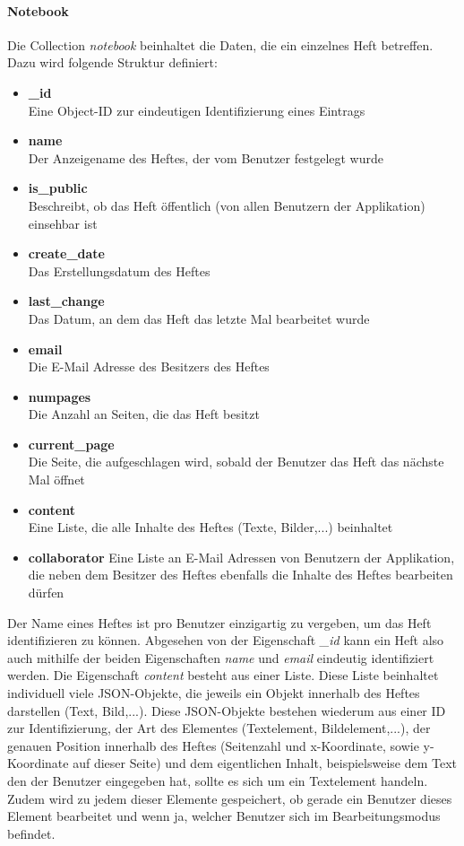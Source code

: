 \paragraph{Notebook}
\label{sec:datamgmt-notebook}
Die Collection \textit{notebook} beinhaltet die Daten, die ein einzelnes Heft betreffen. Dazu wird folgende Struktur definiert:
\begin{itemize}
\item \textbf{\_id}\\ Eine Object-ID zur eindeutigen Identifizierung eines Eintrags
\item \textbf{name}\\ Der Anzeigename des Heftes, der vom Benutzer festgelegt wurde
\item \textbf{is\_public}\\ Beschreibt, ob das Heft öffentlich (von allen Benutzern der Applikation) einsehbar ist
\item \textbf{create\_date}\\ Das Erstellungsdatum des Heftes
\item \textbf{last\_change}\\ Das Datum, an dem das Heft das letzte Mal bearbeitet wurde
\item \textbf{email}\\ Die E-Mail Adresse des Besitzers des Heftes
\item \textbf{numpages}\\ Die Anzahl an Seiten, die das Heft besitzt
\item \textbf{current\_page}\\ Die Seite, die aufgeschlagen wird, sobald der Benutzer das Heft das nächste Mal öffnet
\item \textbf{content}\\ Eine Liste, die alle Inhalte des Heftes (Texte, Bilder,...) beinhaltet
\item \textbf{collaborator} Eine Liste an E-Mail Adressen von Benutzern der Applikation, die neben dem Besitzer des Heftes ebenfalls die Inhalte des Heftes bearbeiten dürfen
\end{itemize}
Der Name eines Heftes ist pro Benutzer einzigartig zu vergeben, um das Heft identifizieren zu können. Abgesehen von der Eigenschaft \textit{\_id} kann ein Heft also auch mithilfe der beiden Eigenschaften \textit{name} und \textit{email} eindeutig identifiziert werden. Die Eigenschaft \textit{content} besteht aus einer Liste. Diese Liste beinhaltet individuell viele JSON-Objekte, die jeweils ein Objekt innerhalb des Heftes darstellen (Text, Bild,...). Diese JSON-Objekte bestehen wiederum aus einer ID zur Identifizierung, der Art des Elementes (Textelement, Bildelement,...), der genauen Position innerhalb des Heftes (Seitenzahl und x-Koordinate, sowie y-Koordinate auf dieser Seite) und dem eigentlichen Inhalt, beispielsweise dem Text den der Benutzer eingegeben hat, sollte es sich um ein Textelement handeln. Zudem wird zu jedem dieser Elemente gespeichert, ob gerade ein Benutzer dieses Element bearbeitet und wenn ja, welcher Benutzer sich im Bearbeitungsmodus befindet.


